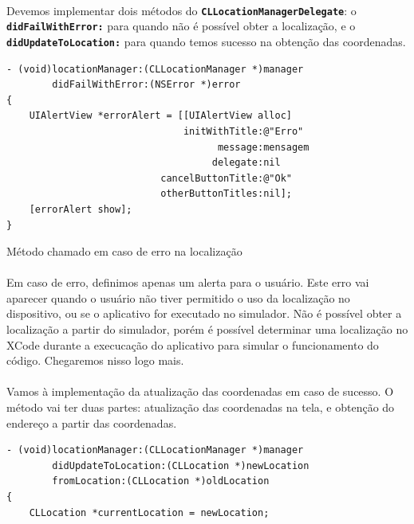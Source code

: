 \documentclass[a4paper,12pt,brazil,doubleside]{book}
\begin{document}
\begin{singlespace}
\paragraph{}Devemos implementar dois métodos do \texttt{\textbf{CLLocationManagerDelegate}}: o\\ \texttt{\textbf{didFailWithError:}} para quando não é possível obter a localização, e o\\ \texttt{\textbf{didUpdateToLocation:}} para quando temos sucesso na obtenção das coordenadas.

\begin{listing}[H]
\begin{verbatim}
- (void)locationManager:(CLLocationManager *)manager
        didFailWithError:(NSError *)error
{
    UIAlertView *errorAlert = [[UIAlertView alloc]
                               initWithTitle:@"Erro"
                                     message:mensagem
                                    delegate:nil
                           cancelButtonTitle:@"Ok"
                           otherButtonTitles:nil];
    [errorAlert show];
}
\end{verbatim}
\caption{Método chamado em caso de erro na localização}
\end{listing}

\paragraph{}Em caso de erro, definimos apenas um alerta para o usuário. Este erro vai aparecer quando o usuário não tiver permitido o uso da localização no dispositivo, ou se o aplicativo for executado no simulador. Não é possível obter a localização a partir do simulador, porém é possível determinar uma localização no XCode durante a execucação do aplicativo para simular o funcionamento do código. Chegaremos nisso logo mais.
\paragraph{}Vamos à implementação da atualização das coordenadas em caso de sucesso. O método vai ter duas partes: atualização das coordenadas na tela, e obtenção do endereço a partir das coordenadas.

\begin{listing}[H]
\begin{verbatim}
- (void)locationManager:(CLLocationManager *)manager
        didUpdateToLocation:(CLLocation *)newLocation
        fromLocation:(CLLocation *)oldLocation
{
    CLLocation *currentLocation = newLocation;
    

\end{verbatim}
\end{listing}
\end{singlespace}
\end{document}
